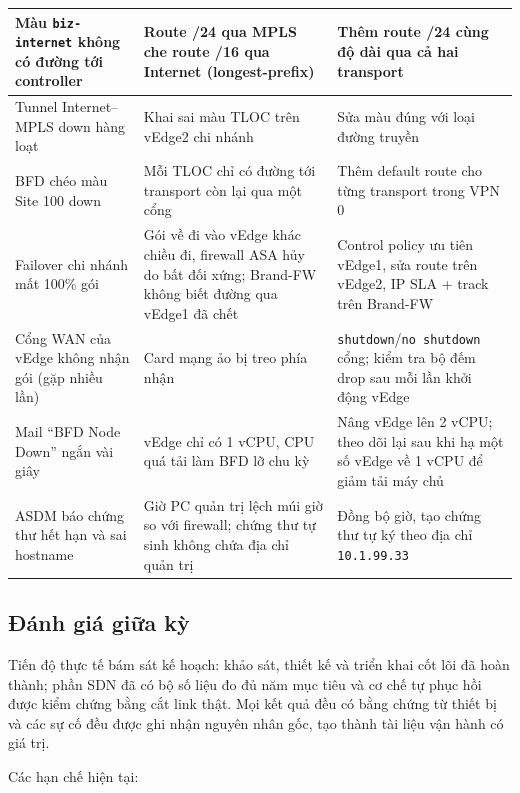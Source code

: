 \begin{longtable}{|P{3.3cm}|P{4.7cm}|P{4.8cm}|}
    \hline
    Màu \texttt{biz-internet} không có đường tới controller & Route /24 qua MPLS che route /16 qua Internet (longest-prefix) & Thêm route /24 cùng độ dài qua cả hai transport \\
    \hline
    Tunnel Internet--MPLS down hàng loạt & Khai sai màu TLOC trên vEdge2 chi nhánh & Sửa màu đúng với loại đường truyền \\
    \hline
    BFD chéo màu Site 100 down & Mỗi TLOC chỉ có đường tới transport còn lại qua một cổng & Thêm default route cho từng transport trong VPN 0 \\
    \hline
    Failover chi nhánh mất 100\% gói & Gói về đi vào vEdge khác chiều đi, firewall ASA hủy do bất đối xứng; Brand-FW không biết đường qua vEdge1 đã chết & Control policy ưu tiên vEdge1, sửa route trên vEdge2, IP SLA + track trên Brand-FW \\
    \hline
    Cổng WAN của vEdge không nhận gói (gặp nhiều lần) & Card mạng ảo bị treo phía nhận & \texttt{shutdown}/\texttt{no shutdown} cổng; kiểm tra bộ đếm drop sau mỗi lần khởi động vEdge \\
    \hline
    Mail ``BFD Node Down'' ngắn vài giây & vEdge chỉ có 1 vCPU, CPU quá tải làm BFD lỡ chu kỳ & Nâng vEdge lên 2 vCPU; theo dõi lại sau khi hạ một số vEdge về 1 vCPU để giảm tải máy chủ \\
    \hline
    ASDM báo chứng thư hết hạn và sai hostname & Giờ PC quản trị lệch múi giờ so với firewall; chứng thư tự sinh không chứa địa chỉ quản trị & Đồng bộ giờ, tạo chứng thư tự ký theo địa chỉ \texttt{10.1.99.33} \\
\end{longtable}
\endgroup

\subsection{Đánh giá giữa kỳ}

Tiến độ thực tế bám sát kế hoạch: khảo sát, thiết kế và triển khai cốt lõi đã hoàn thành; phần SDN đã có bộ số liệu đo đủ năm mục tiêu và cơ chế tự phục hồi được kiểm chứng bằng cắt link thật. Mọi kết quả đều có bằng chứng từ thiết bị và các sự cố đều được ghi nhận nguyên nhân gốc, tạo thành tài liệu vận hành có giá trị.

Các hạn chế hiện tại:

